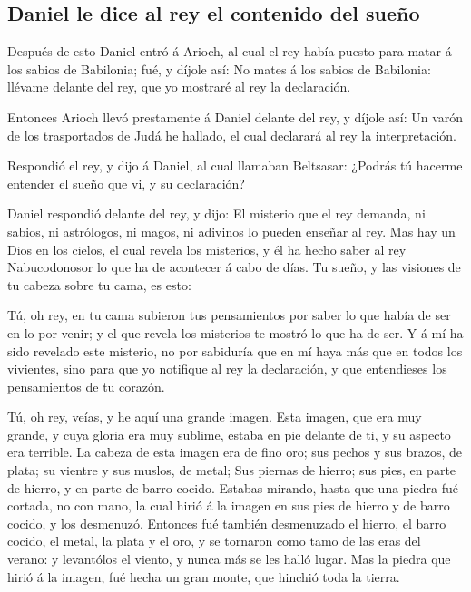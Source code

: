 \hypertarget{daniel-le-dice-al-rey-el-contenido-del-sueuxf1o}{%
\subsection{Daniel le dice al rey el contenido del
sueño}\label{daniel-le-dice-al-rey-el-contenido-del-sueuxf1o}}

 Después de esto Daniel entró á Arioch, al cual el rey
había puesto para matar á los sabios de Babilonia; fué, y díjole así: No
mates á los sabios de Babilonia: llévame delante del rey, que yo
mostraré al rey la declaración.

 Entonces Arioch llevó prestamente á Daniel delante del
rey, y díjole así: Un varón de los trasportados de Judá he hallado, el
cual declarará al rey la interpretación.

 Respondió el rey, y dijo á Daniel, al cual llamaban
Beltsasar: ¿Podrás tú hacerme entender el sueño que vi, y su
declaración?

 Daniel respondió delante del rey, y dijo: El misterio que
el rey demanda, ni sabios, ni astrólogos, ni magos, ni adivinos lo
pueden enseñar al rey.  Mas hay un Dios en los cielos, el
cual revela los misterios, y él ha hecho saber al rey Nabucodonosor lo
que ha de acontecer á cabo de días. Tu sueño, y las visiones de tu
cabeza sobre tu cama, es esto:

 Tú, oh rey, en tu cama subieron tus pensamientos por saber
lo que había de ser en lo por venir; y el que revela los misterios te
mostró lo que ha de ser.  Y á mí ha sido revelado este
misterio, no por sabiduría que en mí haya más que en todos los
vivientes, sino para que yo notifique al rey la declaración, y que
entendieses los pensamientos de tu corazón.

 Tú, oh rey, veías, y he aquí una grande imagen. Esta
imagen, que era muy grande, y cuya gloria era muy sublime, estaba en pie
delante de ti, y su aspecto era terrible.  La cabeza de
esta imagen era de fino oro; sus pechos y sus brazos, de plata; su
vientre y sus muslos, de metal;  Sus piernas de hierro; sus
pies, en parte de hierro, y en parte de barro cocido. 
Estabas mirando, hasta que una piedra fué cortada, no con mano, la cual
hirió á la imagen en sus pies de hierro y de barro cocido, y los
desmenuzó.  Entonces fué también desmenuzado el hierro, el
barro cocido, el metal, la plata y el oro, y se tornaron como tamo de
las eras del verano: y levantólos el viento, y nunca más se les halló
lugar. Mas la piedra que hirió á la imagen, fué hecha un gran monte, que
hinchió toda la tierra.


